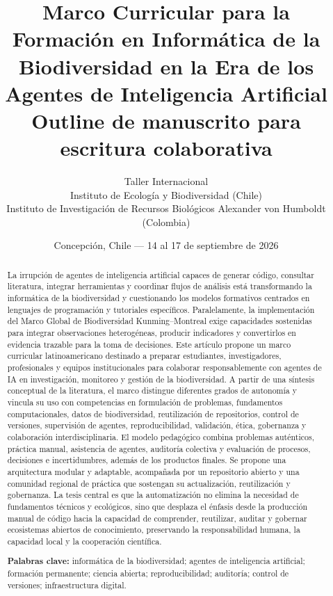 \documentclass[11pt,a4paper]{article}
\title{\textbf{Marco Curricular para la Formación en Informática de la
Biodiversidad en la Era de los Agentes de Inteligencia Artificial}\\[0.6em]
\large Outline de manuscrito para escritura colaborativa}
\author{Taller Internacional\\
Instituto de Ecología y Biodiversidad (Chile)\\
Instituto de Investigación de Recursos Biológicos Alexander von Humboldt (Colombia)\\[0.5em]
\pendiente{autorías y afiliaciones}}
\date{Concepción, Chile --- 14 al 17 de septiembre de 2026}
\begin{document}
\maketitle

\begin{abstract}
\noindent
La irrupción de agentes de inteligencia artificial capaces de generar código, consultar literatura, 
integrar herramientas y coordinar flujos de análisis está transformando la informática de la biodiversidad y 
cuestionando los modelos formativos centrados en lenguajes de programación y tutoriales específicos. Paralelamente, 
la implementación del Marco Global de Biodiversidad Kunming–Montreal exige capacidades sostenidas para integrar 
observaciones heterogéneas, producir indicadores y convertirlos en evidencia trazable para la toma de decisiones. 
Este artículo propone un marco curricular latinoamericano destinado a preparar estudiantes, investigadores, profesionales 
y equipos institucionales para colaborar responsablemente con agentes de IA en investigación, monitoreo y gestión de la 
biodiversidad. A partir de una síntesis conceptual de la literatura, el marco distingue diferentes grados de autonomía y 
vincula su uso con competencias en formulación de problemas, fundamentos computacionales, datos de biodiversidad, 
reutilización de repositorios, control de versiones, supervisión de agentes, reproducibilidad, validación, ética, gobernanza 
y colaboración interdisciplinaria. El modelo pedagógico combina problemas auténticos, práctica manual, asistencia de agentes, 
auditoría colectiva y evaluación de procesos, decisiones e incertidumbres, además de los productos finales. Se propone una 
arquitectura modular y adaptable, acompañada por un repositorio abierto y una comunidad regional de práctica que sostengan 
su actualización, reutilización y gobernanza. La tesis central es que la automatización no elimina la necesidad de fundamentos 
técnicos y ecológicos, sino que desplaza el énfasis desde la producción manual de código hacia la capacidad de comprender, 
reutilizar, auditar y gobernar ecosistemas abiertos de conocimiento, preservando la responsabilidad humana, la capacidad local y 
la cooperación científica.


\medskip
\noindent\textbf{Palabras clave:} informática de la biodiversidad; agentes de
inteligencia artificial; formación permanente; ciencia abierta; reproducibilidad;
auditoría; control de versiones; infraestructura digital.
\end{abstract}

\tableofcontents
\newpage
\end{document}
